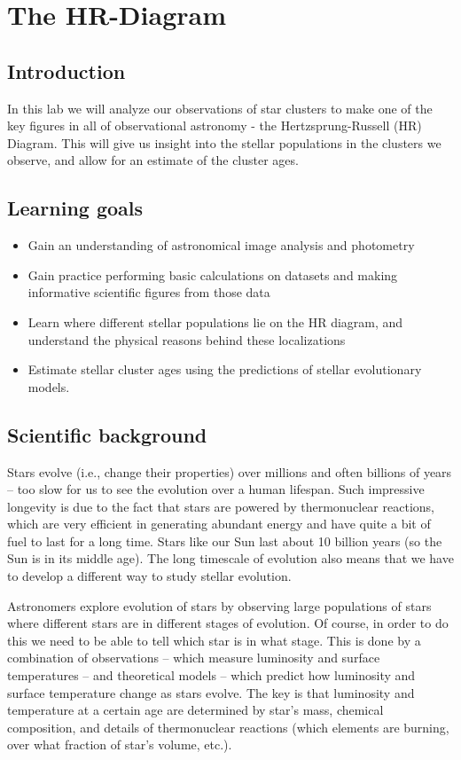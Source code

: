 \chapter{The HR-Diagram}

\section{Introduction}

In this lab we will analyze our observations of star clusters to make one of the key figures in all of observational astronomy - the Hertzsprung-Russell (HR) Diagram. This will give us insight into the stellar populations in the clusters we observe, and allow for an estimate of the cluster ages. 

\section{Learning goals}

\begin{itemize}
    \item Gain an understanding of astronomical image analysis and photometry
	\item Gain practice performing basic calculations on datasets and making informative scientific figures from those data
	\item Learn where different stellar populations lie on the HR diagram, and understand the physical reasons behind these localizations
	\item Estimate stellar cluster ages using the predictions of stellar evolutionary models. 
\end{itemize}

\section{Scientific background}

Stars evolve (i.e., change their properties) over millions and often billions of years – too slow for us to see the evolution over a human lifespan.  Such impressive longevity is due to the fact that stars are powered by thermonuclear reactions, which are very efficient in generating abundant energy and have quite a bit of fuel to last for a long time. Stars like our Sun last about 10 billion years (so the Sun is in its middle age). The long timescale of evolution also means that we have to develop a different way to study stellar evolution. 

Astronomers explore evolution of stars by observing large populations of stars where different stars are in different stages of evolution. Of course, in order to do this we need to be able to tell which star is in what stage. This is done by a combination of observations – which measure luminosity and surface temperatures – and theoretical models – which predict how luminosity and surface temperature change as stars evolve. The key is that luminosity and temperature at a certain age are determined by star's mass, chemical composition, and details of thermonuclear reactions (which elements are burning, over what fraction of star's volume, etc.).

